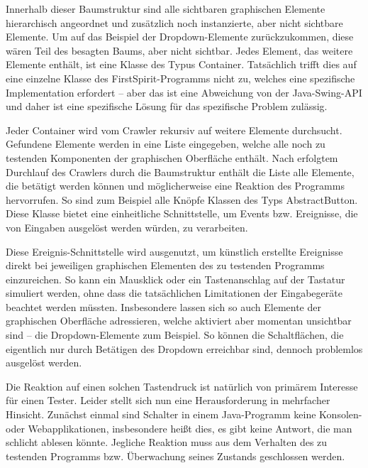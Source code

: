 Innerhalb dieser Baumstruktur sind alle sichtbaren graphischen Elemente
hierarchisch angeordnet und zusätzlich noch instanzierte, aber nicht sichtbare
Elemente. Um auf das Beispiel der Dropdown-Elemente zurückzukommen, diese
wären Teil des besagten Baums, aber nicht sichtbar. Jedes Element, das weitere Elemente enthält,
ist eine Klasse des Typus \glqq{}Container\grqq{}. Tatsächlich trifft dies auf eine
einzelne Klasse des FirstSpirit-Programms nicht zu, welches eine spezifische
Implementation erfordert -- aber das ist eine Abweichung von der Java-Swing-API
und daher ist eine spezifische Lösung für das spezifische Problem zulässig.

Jeder Container wird vom Crawler rekursiv auf weitere Elemente durchsucht.
Gefundene Elemente werden in eine Liste eingegeben, welche alle noch zu
testenden Komponenten der graphischen Oberfläche enthält. Nach erfolgtem
Durchlauf des Crawlers durch die Baumstruktur enthält die Liste
alle Elemente, die betätigt werden können und möglicherweise eine Reaktion
des Programms hervorrufen. So sind zum Beispiel alle Knöpfe Klassen des
Typs \glqq{}AbstractButton\grqq{}. Diese Klasse bietet eine einheitliche Schnittstelle,
um Events bzw. Ereignisse, die von Eingaben ausgelöst werden würden,
zu verarbeiten. 

Diese Ereignis-Schnittstelle wird ausgenutzt, um künstlich erstellte
Ereignisse direkt bei jeweiligen graphischen Elementen des zu testenden 
Programms einzureichen. So kann ein Mausklick oder ein Tastenanschlag 
auf der Tastatur simuliert werden, ohne dass die tatsächlichen Limitationen
der Eingabegeräte beachtet werden müssten. Insbesondere lassen sich so
auch Elemente der graphischen Oberfläche adressieren, welche aktiviert
aber momentan unsichtbar sind -- die Dropdown-Elemente zum Beispiel.
So können die Schaltflächen, die eigentlich nur durch Betätigen des
Dropdown erreichbar sind, dennoch problemlos ausgelöst werden.

Die Reaktion auf einen solchen Tastendruck ist natürlich von primärem
Interesse für einen Tester. Leider stellt sich nun eine Herausforderung
in mehrfacher Hinsicht. Zunächst einmal sind Schalter in einem 
Java-Programm keine Konsolen- oder Webapplikationen, insbesondere
heißt dies, es gibt keine Antwort, die man schlicht ablesen könnte.
Jegliche Reaktion muss aus dem Verhalten des zu testenden Programms
bzw. Überwachung seines Zustands geschlossen werden.

